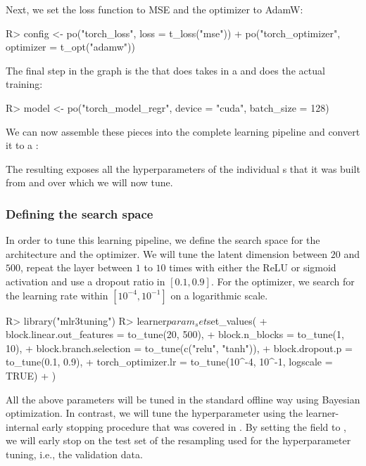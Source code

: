 \documentclass[article]{jss}
\theoremstyle{definition}
\begin{document}
Next, we set the loss function to MSE and the optimizer to AdamW:

\begin{CodeInput}
R> config <- po("torch_loss", loss = t_loss("mse")) %
+    po("torch_optimizer", optimizer = t_opt("adamw"))
\end{CodeInput}

The final step in the graph is the  that does takes in a  and does the actual training:

\begin{CodeInput}
R> model <- po("torch_model_regr", device = "cuda", batch_size = 128)
\end{CodeInput}

We can now assemble these pieces into the complete learning pipeline and convert it to a :


The resulting  exposes all the hyperparameters of the individual s that it was built from and over which we will now tune.

\subsubsection{Defining the search space}
In order to tune this learning pipeline, we define the search space for the architecture and the optimizer.
We will tune the latent dimension between $20$ and $500$, repeat the layer between $1$ to $10$ times with either the ReLU or sigmoid activation and use a dropout ratio in $[0.1, 0.9]$.
For the optimizer, we search for the learning rate within $[10^{-4}, 10^{-1}]$ on a logarithmic scale.

\begin{CodeInput}
R> library("mlr3tuning")
R> learner$param_set$set_values(
+    block.linear.out_features = to_tune(20, 500),
+    block.n_blocks = to_tune(1, 10),
+    block.branch.selection = to_tune(c("relu", "tanh")),
+    block.dropout.p = to_tune(0.1, 0.9),
+    torch_optimizer.lr = to_tune(10^-4, 10^-1, logscale = TRUE)
+  )
\end{CodeInput}

All the above parameters will be tuned in the standard offline way using Bayesian optimization.
In contrast, we will tune the  hyperparameter using the learner-internal early stopping procedure that was covered in .
By setting the  field to , we will early stop on the test set of the resampling used for the hyperparameter tuning, i.e., the validation data.
\end{document}

